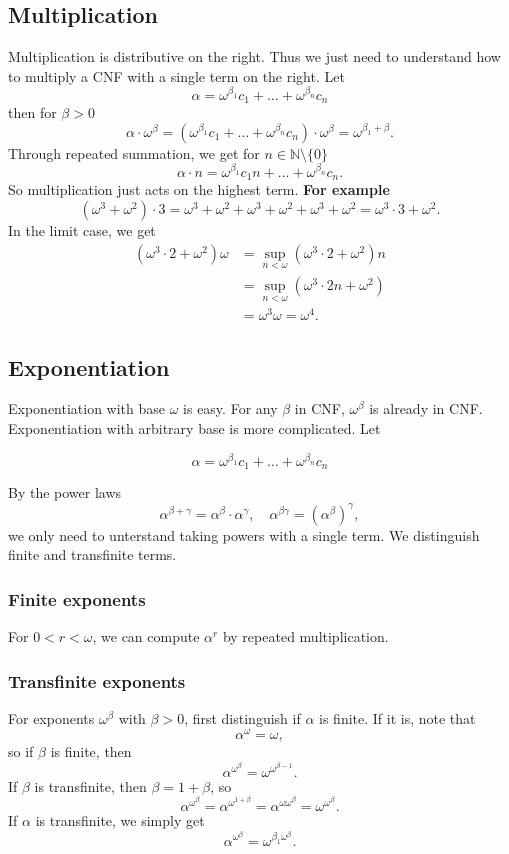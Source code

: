 \subsection{Multiplication}
Multiplication is distributive on the right. Thus we just need to understand how to multiply a CNF with a single term on the right. Let
\[ \alpha = \omega^{\beta_1}c_1 + \ldots + \omega^{\beta_n}c_n \]
then for $\beta > 0$
\[ \alpha \cdot \omega^\beta = (\omega^{\beta_1}c_1 + \ldots + \omega^{\beta_n}c_n) \cdot \omega^\beta = \omega^{\beta_1 + \beta}. \]
Through repeated summation, we get for $n \in \mathbb N \setminus \{0\}$
\[ \alpha \cdot n = \omega^{\beta_1}c_1 n + \ldots + \omega^{\beta_n}c_n. \]
So multiplication just acts on the highest term. \textbf{For example}
\[ (\omega^3 + \omega^2)\cdot 3 = \omega^3 + \omega^2 + \omega^3 + \omega^2 + \omega^3 + \omega^2 = \omega^3\cdot 3 + \omega^2. \]
In the limit case, we get
\begin{align*}
 (\omega^3 \cdot 2 + \omega^2)\omega &= \sup_{n < \omega} (\omega^3 \cdot 2 + \omega^2)n \\
 &= \sup_{n < \omega} (\omega^3 \cdot 2n + \omega^2) \\
 &= \omega^3 \omega = \omega^4.
\end{align*}

\subsection{Exponentiation}
Exponentiation with base $\omega$ is easy. For any $\beta$ in CNF, $\omega^\beta$ is already in CNF. Exponentiation with arbitrary base is more complicated. Let

\[ \alpha = \omega^{\beta_1}c_1 + \ldots + \omega^{\beta_n}c_n \]

By the power laws
\[
 \alpha^{\beta + \gamma} = \alpha^\beta \cdot \alpha^\gamma, \quad \alpha^{\beta \gamma} = (\alpha^\beta)^\gamma, \]
we only need to unterstand taking powers with a single term. We distinguish finite and transfinite terms. 

\subsubsection{Finite exponents}
For $0 < r < \omega$, we can compute $\alpha^r$ by repeated multiplication. \\

\subsubsection{Transfinite exponents}
For exponents $\omega^\beta$ with $\beta > 0$, first distinguish if $\alpha$ is finite. If it is, note that
\[ \alpha^\omega = \omega, \]
so if $\beta$ is finite, then
\[ \alpha^{\omega^\beta} = \omega^{\omega^{\beta-1}}. \]
If $\beta$ is transfinite, then $\beta = 1 + \beta$, so
\[ \alpha^{\omega^\beta} = \alpha^{\omega^{1+\beta}} = \alpha^{\omega\omega^\beta} = \omega^{\omega^\beta}. \]
If $\alpha$ is transfinite, we simply get 
\[ \alpha^{\omega^\beta} = \omega^{\beta_1\omega^\beta}. \]

